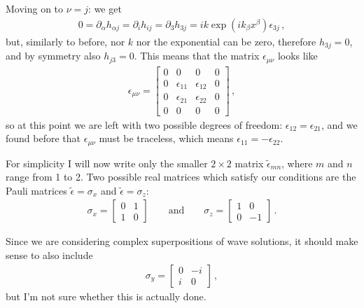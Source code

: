 \documentclass[main.tex]{subfiles}
\begin{document}
Moving on to \(\nu = j \): we get 
%
\begin{align}
0 = \partial_{\alpha } h_{\alpha j} = \partial_{i } h_{ij} = \partial_{3} h_{3 j} = ik \exp(ik_{\beta } x^{\beta } ) \epsilon_{3j}
\,,
\end{align}
%
but, similarly to before, nor \(k\) nor the exponential can be zero, therefore \(h_{3j}=0\), and by symmetry also \(h_{j3}=0\). This means that the matrix \(\epsilon_{\mu \nu }\) looks like 
%
\begin{align}
\epsilon_{\mu \nu } = \left[\begin{array}{cccc}
0 & 0 & 0 & 0 \\ 
0 & \epsilon_{11} & \epsilon_{12} & 0 \\ 
0 & \epsilon_{21} & \epsilon_{22} & 0 \\ 
0 & 0 & 0 & 0
\end{array}\right]
\,,
\end{align}
%
so at this point we are left with two possible degrees of freedom: \(\epsilon_{12} = \epsilon_{21}\), and we found before that \(\epsilon_{\mu \nu }\) must be traceless, which means \(\epsilon_{11} = - \epsilon_{22}\). 

For simplicity I will now write only the smaller \(2 \times 2\) matrix \(\widetilde{\epsilon}_{mn}\), where \(m\) and \(n\) range from 1 to 2. Two possible real matrices which satisfy our conditions are the Pauli matrices \(\widetilde{\epsilon}=   \sigma_{x} \) and \( \widetilde{\epsilon} = \sigma_{z}\): 
%
\begin{align}
\sigma_{x} = \left[\begin{array}{cc}
0 & 1 \\ 
1 & 0
\end{array}\right] \qquad \text{and} \qquad
\sigma_{z} = \left[\begin{array}{cc}
1 & 0 \\ 
0 & -1
\end{array}\right]
\,.
\end{align}

Since we are considering complex superpositions of wave solutions, it should make sense to also include 
%
\begin{align}
\sigma_{y} = \left[\begin{array}{cc}
0 & -i \\ 
i & 0
\end{array}\right]
\,,
\end{align}
%
but I'm not sure whether this is actually done. 
\end{document}
